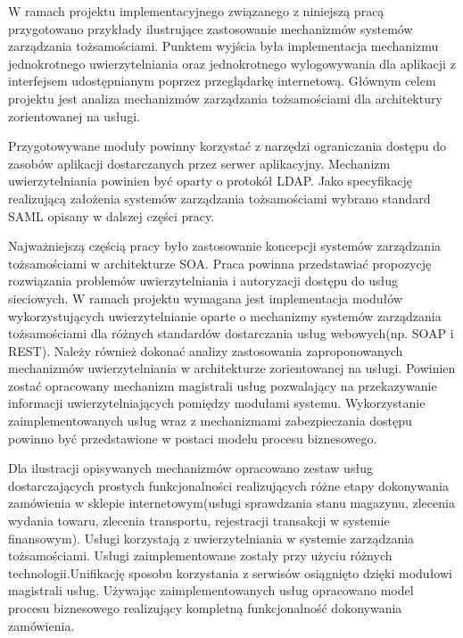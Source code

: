 
\label{sec:zakresWymagan}

	W ramach projektu implementacyjnego  związanego z niniejszą pracą przygotowano przykłady ilustrujące zastosowanie mechanizmów systemów zarządzania tożsamościami. Punktem wyjścia była implementacja mechanizmu jednokrotnego uwierzytelniania oraz jednokrotnego wylogowywania dla aplikacji z interfejsem udostępnianym poprzez przeglądarkę internetową. Głównym celem projektu jest analiza mechanizmów zarządzania tożsamościami dla architektury zorientowanej na usługi.

	Przygotowywane moduły powinny korzystać z narzędzi ograniczania dostępu do zasobów aplikacji dostarczanych przez serwer aplikacyjny. Mechanizm uwierzytelniania powinien być oparty o protokół LDAP. Jako specyfikację realizującą założenia systemów zarządzania tożsamościami wybrano standard SAML opisany w dalszej części pracy.

	Najważniejszą częścią pracy było zastosowanie koncepcji systemów zarządzania tożsamościami w architekturze SOA. Praca powinna przedstawiać propozycję rozwiązania problemów uwierzytelniania i autoryzacji dostępu do usług sieciowych. W ramach projektu wymagana jest implementacja modułów wykorzystujących uwierzytelnianie oparte o mechanizmy systemów zarządzania tożsamościami dla różnych standardów dostarczania usług webowych(np. SOAP i REST). Należy również dokonać analizy zastosowania zaproponowanych mechanizmów uwierzytelniania w architekturze zorientowanej na usługi. Powinien zostać opracowany mechanizm magistrali usług pozwalający na przekazywanie informacji uwierzytelniających pomiędzy modułami systemu. Wykorzystanie zaimplementowanych usług wraz z mechanizmami zabezpieczania dostępu powinno być przedstawione w postaci modelu procesu biznesowego. 

	Dla ilustracji opisywanych mechanizmów opracowano zestaw usług dostarczających prostych funkcjonalności realizujących różne etapy dokonywania zamówienia w sklepie internetowym(usługi sprawdzania stanu magazynu, zlecenia wydania towaru,   zlecenia transportu, rejestracji transakcji w systemie finansowym). Usługi korzystają z uwierzytelniania w systemie zarządzania tożsamościami. Usługi zaimplementowane zostały przy użyciu różnych technologii.Unifikację sposobu korzystania z serwisów osiągnięto dzięki modułowi magistrali usług. Używając zaimplementowanych usług opracowano model procesu biznesowego realizujący kompletną funkcjonalność dokonywania zamówienia.
